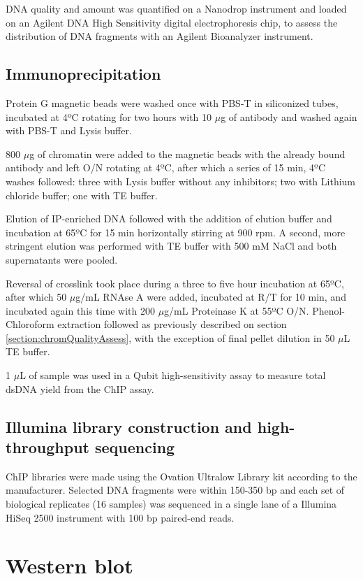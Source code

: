 \documentclass[11pt,twoside,a4paper]{report}
\begin{document}
			DNA quality and amount was quantified on a Nanodrop instrument and loaded on an Agilent DNA High Sensitivity digital electrophoresis chip, to assess the distribution of DNA fragments with an Agilent Bioanalyzer instrument.
			
			\subsection{Immunoprecipitation}
			Protein G magnetic beads were washed once with PBS-T in siliconized tubes, incubated at 4ºC rotating for two hours with 10 $\mu$g of antibody and washed again with PBS-T and Lysis buffer.
			
			800 $\mu$g of chromatin were added to the magnetic beads with the already bound antibody and left O/N rotating at 4ºC, after which a series of 15 min, 4ºC washes followed: three with Lysis buffer without any inhibitors; two with Lithium chloride buffer; one with TE buffer.
			
			Elution of IP-enriched DNA followed with the addition of elution buffer and incubation at 65ºC for 15 min horizontally stirring at 900 rpm. A second, more stringent elution was performed with TE buffer with 500 mM NaCl and both supernatants were pooled.
			
			Reversal of crosslink took place during a three to five hour incubation at 65ºC, after which 50 $\mu$g/mL RNAse A were added, incubated at R/T for 10 min, and incubated again this time with 200 $\mu$g/mL Proteinase K at 55ºC O/N. Phenol-Chloroform extraction followed as previously described on section \ref{section:chromQualityAssess}, with the exception of final pellet dilution in 50 $\mu$L TE buffer.
			
			1 $\mu$L of sample was used in a Qubit high-sensitivity assay to measure total dsDNA yield from the ChIP assay.
			
			\subsection{Illumina library construction and high-throughput sequencing}
			ChIP libraries were made using the Ovation Ultralow Library kit according to the manufacturer. Selected DNA fragments were within 150-350 bp and each set of biological replicates (16 samples) was sequenced in a single lane of a Illumina HiSeq 2500 instrument with 100 bp paired-end reads.
		
	\section{Western blot}
\end{document}
